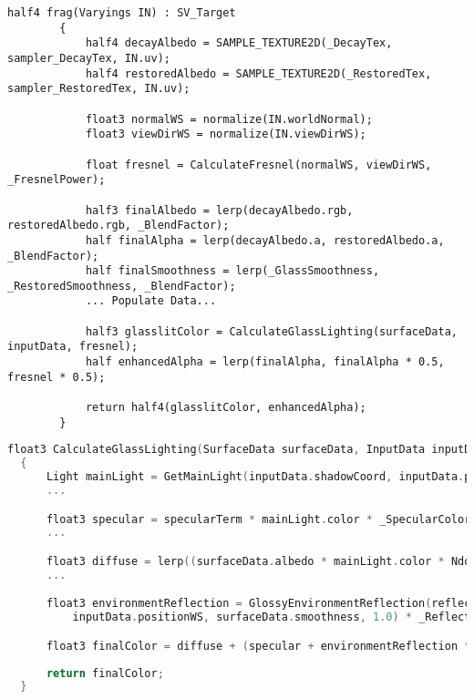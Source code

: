 \begin{lstlisting}[language=HLSL, caption={Partial Fragment shader for blending original and restored textures.}, label={lst:shader_blend}]
        half4 frag(Varyings IN) : SV_Target
        {
            half4 decayAlbedo = SAMPLE_TEXTURE2D(_DecayTex, sampler_DecayTex, IN.uv);
            half4 restoredAlbedo = SAMPLE_TEXTURE2D(_RestoredTex, sampler_RestoredTex, IN.uv);

            float3 normalWS = normalize(IN.worldNormal);
            float3 viewDirWS = normalize(IN.viewDirWS);

            float fresnel = CalculateFresnel(normalWS, viewDirWS, _FresnelPower);

            half3 finalAlbedo = lerp(decayAlbedo.rgb, restoredAlbedo.rgb, _BlendFactor);
            half finalAlpha = lerp(decayAlbedo.a, restoredAlbedo.a, _BlendFactor);
            half finalSmoothness = lerp(_GlassSmoothness, _RestoredSmoothness, _BlendFactor);
            ... Populate Data...
            
            half3 glasslitColor = CalculateGlassLighting(surfaceData, inputData, fresnel);            
            half enhancedAlpha = lerp(finalAlpha, finalAlpha * 0.5, fresnel * 0.5);
            
            return half4(glasslitColor, enhancedAlpha);
        }
\end{lstlisting}


\begin{lstlisting}[language=C++, caption={Lighting Glass Texture Partial Calculation.}, label={lst:lighting_glass}]
  float3 CalculateGlassLighting(SurfaceData surfaceData, InputData inputData, float fresnel)
  {
      Light mainLight = GetMainLight(inputData.shadowCoord, inputData.positionWS, inputData.shadowMask);
      ...

      float3 specular = specularTerm * mainLight.color * _SpecularColor.rgb * surfaceData.smoothness;
      ...

      float3 diffuse = lerp((surfaceData.albedo * mainLight.color * NdotL * 0.1),surfaceData.albedo, _BlendFactor);
      ...     

      float3 environmentReflection = GlossyEnvironmentReflection(reflectionVector, 
          inputData.positionWS, surfaceData.smoothness, 1.0) * _ReflectionIntensity;

      float3 finalColor = diffuse + (specular + environmentReflection * fresnel);
      
      return finalColor;
  }
\end{lstlisting}

